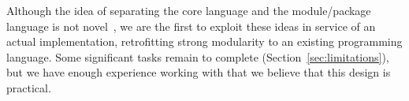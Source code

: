 %
Although the idea of separating the core language and the module/package
language is not novel~\cite{leroy:modular,milner+:def-of-sml-revised,rossberg+:f-ing}, we are the first to exploit these ideas in service
of an actual implementation, retrofitting strong modularity to an existing
programming language.  Some significant tasks remain to complete \Backpack{}
(Section~\ref{sec:limitations}),
but we have enough experience working with \Backpack{} that we believe that
this design is practical.




